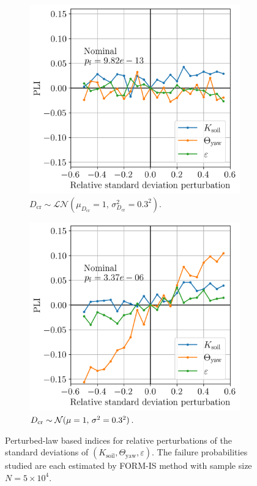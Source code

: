 \begin{figure}
    \centering
    \begin{subfigure}[t]{0.48\linewidth}
        \includegraphics[width=\linewidth]{./part3/figures/OWT/PLI_ALL_Hyp_LogNormal.png}
        \caption{$D_{\mathrm{cr}} \sim \mathcal{LN}(\mu_{D_{\mathrm{cr}}}=1, \, \sigma^2_{D_{\mathrm{cr}}}=0.3^2)$.}
    \end{subfigure}
    \begin{subfigure}[t]{0.48\linewidth}
        \includegraphics[width=\linewidth]{./part3/figures/OWT/PLI_ALL_Hyp_Normal.png}
        \caption{$D_{\mathrm{cr}} \sim \mathcal{N}(\mu=1, \, \sigma^2=0.3^2)$.}
    \end{subfigure}
    \caption{Perturbed-law based indices for relative perturbations of the standard deviations of $(K_{\mathrm{soil}}, \Theta_{\mathrm{yaw}}, \varepsilon)$. 
    The failure probabilities studied are each estimated by FORM-IS method with sample size $N=5 \times 10^4$.}
    \label{fig:pli_all}
\end{figure}


